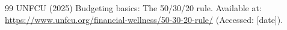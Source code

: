 \begin{thebibliography}{99}
UNFCU (2025) Budgeting basics: The 50/30/20 rule. Available at: \url{https://www.unfcu.org/financial-wellness/50-30-20-rule/} (Accessed: [date]).
\end{thebibliography}

